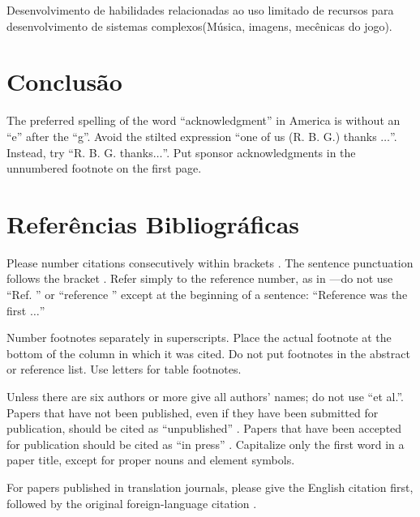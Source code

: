 \documentclass[conference]{IEEEtran}
\begin{document}
Desenvolvimento de habilidades relacionadas ao uso limitado de recursos para desenvolvimento de sistemas complexos(Música, imagens, mecênicas do jogo).

\section*{Conclusão}

The preferred spelling of the word ``acknowledgment'' in America is without 
an ``e'' after the ``g''. Avoid the stilted expression ``one of us (R. B. 
G.) thanks $\ldots$''. Instead, try ``R. B. G. thanks$\ldots$''. Put sponsor 
acknowledgments in the unnumbered footnote on the first page.

\section*{Referências Bibliográficas}

Please number citations consecutively within brackets \cite{b1}. The 
sentence punctuation follows the bracket \cite{b2}. Refer simply to the reference 
number, as in \cite{b3}---do not use ``Ref. \cite{b3}'' or ``reference \cite{b3}'' except at 
the beginning of a sentence: ``Reference \cite{b3} was the first $\ldots$''

Number footnotes separately in superscripts. Place the actual footnote at 
the bottom of the column in which it was cited. Do not put footnotes in the 
abstract or reference list. Use letters for table footnotes.

Unless there are six authors or more give all authors' names; do not use 
``et al.''. Papers that have not been published, even if they have been 
submitted for publication, should be cited as ``unpublished'' \cite{b4}. Papers 
that have been accepted for publication should be cited as ``in press'' \cite{b5}. 
Capitalize only the first word in a paper title, except for proper nouns and 
element symbols.

For papers published in translation journals, please give the English 
citation first, followed by the original foreign-language citation \cite{b6}.
\end{document}
